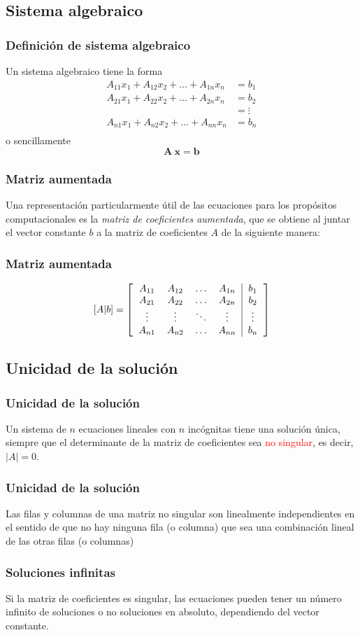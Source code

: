 \subsection{Sistema algebraico}
\begin{frame}
\frametitle{Definición de sistema algebraico}
Un sistema algebraico tiene la forma
\[ \begin{split}
A_{11} x_{1} + A_{12} x_{2} + \ldots + A_{1n} x_{n} &= b_{1} \\
A_{21} x_{1} + A_{22} x_{2} + \ldots + A_{2n} x_{n} &= b_{2} \\
 &= \vdots \\
A_{n1} x_{1} + A_{n2} x_{2} + \ldots + A_{nn} x_{n} &= b_{n} \\
\end{split} \]
o sencillamente
\[ \mathbf{A \: x} = \mathbf{b} \]
\end{frame}
\begin{frame}[fragile]
\frametitle{Matriz aumentada}
Una representación particularmente útil de las ecuaciones para los propósitos computacionales es la \emph{matriz de coeficientes aumentada}, que se obtiene al juntar el vector constante $b$ a la matriz de coeficientes $A$ de la siguiente manera:
\end{frame}
\begin{frame}[fragile]
\frametitle{Matriz aumentada}
\begin{equation*}
\left[ A \vert b \right] = \left[
\begin{tabular}{c c c c | c}
$A_{11}$ & $A_{12}$ & $\ldots$ & $A_{1n}$ & $b_{1}$ \\
$A_{21}$ & $A_{22}$ & $\ldots$ & $A_{2n}$ & $b_{2}$ \\
$\vdots$ & $\vdots$ & $\ddots$ & $\vdots$ & $\vdots$ \\
$A_{n1}$ & $A_{n2}$ & $\ldots$ & $A_{nn}$ & $b_{n}$ 
\end{tabular}
\right]
\end{equation*} 
\end{frame}
\subsection{Unicidad de la solución}
\begin{frame}
\frametitle{Unicidad de la solución}
Un sistema de $n$ ecuaciones lineales con $n$ incógnitas tiene una solución única, siempre que el determinante de la matriz de coeficientes sea \textcolor{red}{no singular}, es decir, $\vert A \vert = 0$. 
\end{frame}
\begin{frame}
\frametitle{Unicidad de la solución}
Las filas y columnas de una matriz no singular son linealmente independientes en el sentido de que no hay ninguna fila (o columna) que sea una combinación lineal de las otras filas (o columnas)
\end{frame}
\begin{frame}
\frametitle{Soluciones infinitas}
Si la matriz de coeficientes es singular, las ecuaciones pueden tener un número infinito de soluciones o no soluciones en absoluto, dependiendo del vector constante.
\end{frame}

